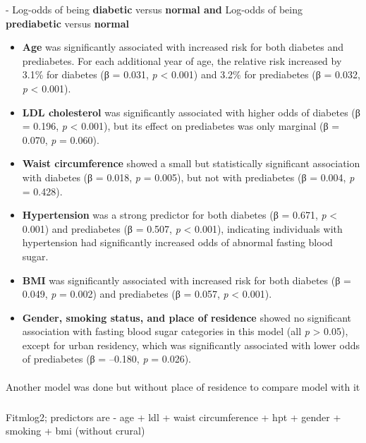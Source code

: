 \documentclass[
  letterpaper,
  DIV=11,
  numbers=noendperiod]{scrartcl}
\makeatletter
\let\oldparagraph\paragraph
\renewcommand{\paragraph}{
    \@ifstar
      \xxxParagraphStar
      \xxxParagraphNoStar
  }
\newcommand{\xxxParagraphStar}[1]{\oldparagraph*{#1}\mbox{}}
\newcommand{\xxxParagraphNoStar}[1]{\oldparagraph{#1}\mbox{}}
\let\oldsubparagraph\subparagraph
\renewcommand{\subparagraph}{
    \@ifstar
      \xxxSubParagraphStar
      \xxxSubParagraphNoStar
  }
\newcommand{\xxxSubParagraphStar}[1]{\oldsubparagraph*{#1}\mbox{}}
\newcommand{\xxxSubParagraphNoStar}[1]{\oldsubparagraph{#1}\mbox{}}
\makeatother
\begin{document}
- Log-odds of being \textbf{diabetic} versus \textbf{normal and}
Log-odds of being \textbf{prediabetic} versus \textbf{normal}

\begin{itemize}
\item
  \textbf{Age} was significantly associated with increased risk for both
  diabetes and prediabetes. For each additional year of age, the
  relative risk increased by 3.1\% for diabetes (β = 0.031, \emph{p}
  \textless{} 0.001) and 3.2\% for prediabetes (β = 0.032, \emph{p}
  \textless{} 0.001).
\item
  \textbf{LDL cholesterol} was significantly associated with higher odds
  of diabetes (β = 0.196, \emph{p} \textless{} 0.001), but its effect on
  prediabetes was only marginal (β = 0.070, \emph{p} = 0.060).
\item
  \textbf{Waist circumference} showed a small but statistically
  significant association with diabetes (β = 0.018, \emph{p} = 0.005),
  but not with prediabetes (β = 0.004, \emph{p} = 0.428).
\item
  \textbf{Hypertension} was a strong predictor for both diabetes (β =
  0.671, \emph{p} \textless{} 0.001) and prediabetes (β = 0.507,
  \emph{p} \textless{} 0.001), indicating individuals with hypertension
  had significantly increased odds of abnormal fasting blood sugar.
\item
  \textbf{BMI} was significantly associated with increased risk for both
  diabetes (β = 0.049, \emph{p} = 0.002) and prediabetes (β = 0.057,
  \emph{p} \textless{} 0.001).
\item
  \textbf{Gender, smoking status, and place of residence} showed no
  significant association with fasting blood sugar categories in this
  model (all \emph{p} \textgreater{} 0.05), except for urban residency,
  which was significantly associated with lower odds of prediabetes (β =
  --0.180, \emph{p} = 0.026).
\end{itemize}

\paragraph{Another model was done but without place of residence to
compare model with
it}\label{another-model-was-done-but-without-place-of-residence-to-compare-model-with-it}

\subparagraph{Fitmlog2; predictors are - age + ldl + waist circumference
+ hpt + gender + smoking + bmi (without
crural)}\label{fitmlog2-predictors-are---age-ldl-waist-circumference-hpt-gender-smoking-bmi-without-crural}
\end{document}
